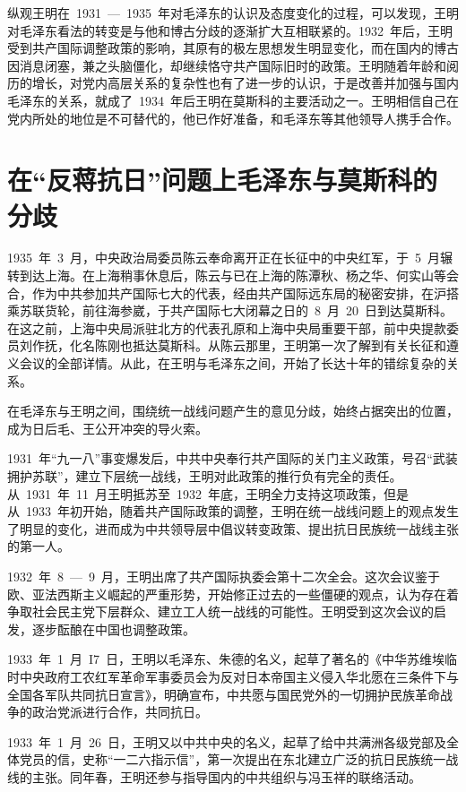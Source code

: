 纵观王明在~1931~—~1935~年对毛泽东的认识及态度变化的过程，可以发现，王明对毛泽东看法的转变是与他和博古分歧的逐渐扩大互相联紧的。1932~年后，王明受到共产国际调整政策的影响，其原有的极左思想发生明显变化，而在国内的博古因消息闭塞，兼之头脑僵化，却继续恪守共产国际旧时的政策。王明随着年龄和阅历的增长，对党内高层关系的复杂性也有了进一步的认识，于是改善并加强与国内毛泽东的关系，就成了~1934~年后王明在莫斯科的主要活动之一。王明相信自己在党内所处的地位是不可替代的，他已作好准备，和毛泽东等其他领导人携手合作。

\section{在“反蒋抗日”问题上毛泽东与莫斯科的分歧}

1935~年~3~月，中央政治局委员陈云奉命离开正在长征中的中央红军，于~5~月辗转到达上海。在上海稍事休息后，陈云与已在上海的陈潭秋、杨之华、何实山等会合，作为中共参加共产国际七大的代表，经由共产国际远东局的秘密安排，在沪搭乘苏联货轮，前往海参崴，于共产国际七大闭幕之日的~8~月~20~日到达莫斯科。在这之前，上海中央局派驻北方的代表孔原和上海中央局重要干部，前中央提款委员刘作抚，化名陈刚也抵达莫斯科。从陈云那里，王明第一次了解到有关长征和遵义会议的全部详情。从此，在王明与毛泽东之间，开始了长达十年的错综复杂的关系。

在毛泽东与王明之间，围绕统一战线问题产生的意见分歧，始终占据突出的位置，成为日后毛、王公开冲突的导火索。

1931~年“九一八”事变爆发后，中共中央奉行共产国际的关门主义政策，号召“武装拥护苏联”，建立下层统一战线，王明对此政策的推行负有完全的责任。从~1931~年~11~月王明抵苏至~1932~年底，王明全力支持这项政策，但是从~1933~年初开始，随着共产国际政策的调整，王明在统一战线问题上的观点发生了明显的变化，进而成为中共领导层中倡议转变政策、提出抗日民族统一战线主张的第一人。

1932~年~8~—~9~月，王明出席了共产国际执委会第十二次全会。这次会议鉴于欧、亚法西斯主义崛起的严重形势，开始修正过去的一些僵硬的观点，认为存在着争取社会民主党下层群众、建立工人统一战线的可能性。王明受到这次会议的启发，逐步酝酿在中国也调整政策。

1933~年~1~月~I7~日，王明以毛泽东、朱德的名义，起草了著名的《中华苏维埃临时中央政府工农红军革命军事委员会为反对日本帝国主义侵入华北愿在三条件下与全国各军队共同抗日宣言》，明确宣布，中共愿与国民党外的一切拥护民族革命战争的政治党派进行合作，共同抗日。

1933~年~1~月~26~日，王明又以中共中央的名义，起草了给中共满洲各级党部及全体党员的信，史称“一二六指示信”，第一次提出在东北建立广泛的抗日民族统一战线的主张。同年春，王明还参与指导国内的中共组织与冯玉祥的联络活动。

